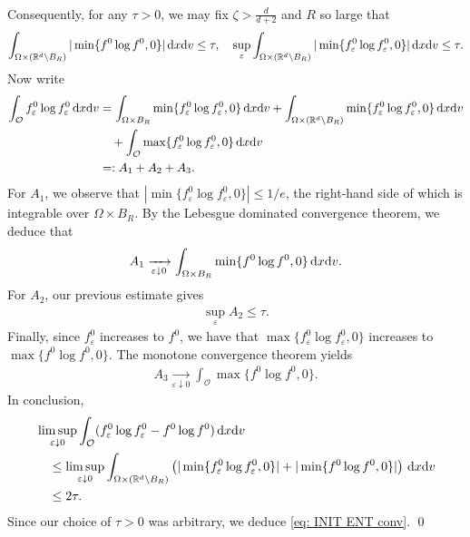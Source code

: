 \documentclass[10pt, reqno]{amsart}
\theoremstyle{plain}
\theoremstyle{definition}
\theoremstyle{remark}
\renewenvironment{proof}[1][\proofname]{\noindent{\scshape #1.\quad}}{\qed}
\numberwithin{equation}{section}
\newcommand{\calO}{\mathcal O}
\newcommand{\R}{\mathbb{R}}
\newcommand{\ve}{\varepsilon}
\newcommand{\dx}{\textnormal{d}x}
\newcommand{\dv}{\textnormal{d}v}
\newcommand{\lt}{\left}
\newcommand{\rt}{\right}
\begin{document}
\begin{proof}
\begin{align*}
    \end{align*}
    Consequently, for any $\tau>0$, we may fix $\zeta > \frac{d}{d+2}$ and $R$ so large that
    \begin{align*}
         \int_{\Omega\times (\R^d\setminus B_R)} |\min\{f^0 \log f^0, 0 \}| \,\dx\dv  \le \tau, \quad \sup_\ve \int_{\Omega\times (\R^d\setminus B_R)} |\min\{f_\ve^0 \log f_\ve^0 , 0 \}| \,\dx\dv \le \tau.
    \end{align*}
    Now write
    \begin{align*}
        \int_{\calO} f_\ve^0 \log f_\ve^0 \,\dx\dv &= \int_{\Omega\times B_R} \min\{f_\ve^0 \log f_\ve^0 , 0 \} \,\dx\dv + \int_{\Omega\times (\R^d\setminus B_R)} \min\{f_\ve^0 \log f_\ve^0 , 0 \} \,\dx\dv \\
        &\quad + \int_{\calO} \max\{f_\ve^0 \log f_\ve^0, 0 \} \,\dx\dv  \\
        &=: A_1 + A_2 + A_3.
    \end{align*}
    For $A_1$, we observe that $|\min\{f_\ve^0\log f_\ve^0, 0 \}| \le 1/e$, the right-hand side of which is integrable over $\Omega\times B_R$. By the Lebesgue dominated convergence theorem, we deduce that
    \begin{align*}
        A_1 \xrightarrow[\ve\downarrow 0]{} \int_{\Omega\times B_R} \min\{f^0 \log f^0, 0 \} \,\dx\dv .
    \end{align*}
    For $A_2$, our previous estimate gives
    \begin{align*}
        \sup_\ve A_2 \le \tau.
    \end{align*}
    Finally, since $f_\ve^0$ increases to $f^0$, we have that $\max\{f_\ve^0 \log f_\ve^0, 0\}$ increases to $\max\{f^0\log f^0, 0\}$. The monotone convergence theorem yields
    \begin{align*}
        A_3 \xrightarrow[\ve\downarrow 0]{} \int_{\calO} \max\{f^0 \log f^0, 0 \}.
    \end{align*}
    In conclusion,
    \begin{align*}
        &\limsup_{\ve\downarrow 0} \int_{\calO} (f_\ve^0 \log f_\ve^0 - f^0 \log f^0) \,\dx\dv \\
        &\quad \le \limsup_{\ve\downarrow 0} \int_{\Omega\times (\R^d\setminus B_R)} \lt( |\min\{f_\ve^0 \log f_\ve^0, 0 \}| + |\min\{f^0 \log f^0, 0 \} | \rt) \,\dx\dv \\
        &\quad \le 2\tau.
    \end{align*}
    Since our choice of $\tau>0$ was arbitrary, we deduce \eqref{eq: INIT ENT conv}.
\end{proof}
\end{document}
